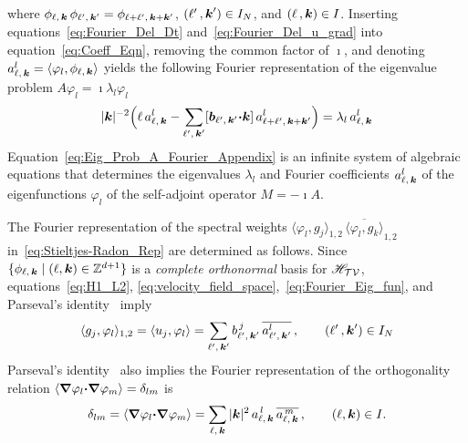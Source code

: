\documentclass[amsa]{ipart}
\begin{document}
%
where $\phi_{\ell,\,\boldsymbol{k}}\,\phi_{\ell^\prime,\,\boldsymbol{k}^\prime}=\phi_{\ell+\ell^\prime,\,\boldsymbol{k}+\boldsymbol{k}^\prime}$,
$(\ell^\prime\,,\boldsymbol{k}^\prime)\in I_N$, and $(\ell\,,\boldsymbol{k})\in I$. Inserting
equations~\eqref{eq:Fourier_Del_Dt} and~\eqref{eq:Fourier_Del_u_grad}
into equation~\eqref{eq:Coeff_Eqn}, removing the common factor of $\imath$,
and denoting $a^l_{\ell,\,\boldsymbol{k}}=\langle\varphi_l,\phi_{\ell,\,\boldsymbol{k}}\rangle$ yields the
following Fourier representation of the eigenvalue problem $A\varphi_l=\imath\lambda_l\varphi_l$
%
\begin{align}\label{eq:Eig_Prob_A_Fourier_Appendix}  
  |\veck|^{-2}\Big(
  \ell\,a^l_{\ell,\,\veck}
  - \sum_{\ell^\prime,\,\veck^\prime}   
  [\vecb_{\ell^\prime,\,\veck^\prime}\bcdot\veck]\, a^l_{\ell+\ell^\prime,\,\veck+\veck^\prime}
  \Big)
  =\lambda_l\,a^l_{\ell,\,\veck}  
\end{align}
%
Equation~\eqref{eq:Eig_Prob_A_Fourier_Appendix} is an infinite system
of algebraic equations that determines the eigenvalues $\lambda_l$ and
Fourier coefficients $a^l_{\ell,\,\boldsymbol{k}}$ of the eigenfunctions $\varphi_l$ of the
self-adjoint operator $M=-\imath A$. 



The Fourier representation of the spectral weights
$\langle\varphi_l,g_j\rangle_{1,2}\,\overline{\langle\varphi_l,g_k\rangle}_{1,2}$
in~\eqref{eq:Stieltjes-Radon_Rep} are determined as follows.
Since $\{\phi_{\ell,\,\boldsymbol{k}}\;|\; (\ell,\boldsymbol{k})\in\mathbb{Z}^{d+1}\}$ is a
\emph{complete orthonormal} basis for $\mathscr{H}_{\mathcal{T}\mathcal{V}}$, 
equations~\eqref{eq:H1_L2},
\eqref{eq:velocity_field_space},~\eqref{eq:Fourier_Eig_fun}, and
Parseval's identity~\cite{PapaRudin:87} imply  
%
\begin{align}\label{eq:Inner_Products}
  \langle g_j,\varphi_l\rangle_{1,2}=\langle u_j,\varphi_l\rangle=\sum_{\ell^\prime,\,\veck^\prime}
   b^{\,j}_{\ell^\prime,\,\veck^\prime}\,\overline{a^l_{\ell^\prime,\,\veck^\prime}}\,,
   \qquad
   (\ell^\prime\,,\veck^\prime)\in I_N
\end{align}
%
Parseval's identity~\cite{PapaRudin:87} also implies the Fourier
representation of the orthogonality relation 
$\langle\mbox{\boldmath${\nabla}$}\varphi_l\mbox{\boldmath${\cdot}$}\mbox{\boldmath${\nabla}$} \varphi_m\rangle=\delta_{lm}$ is 
%
\begin{align}\label{eq:Ortho_Clmn}
  \delta_{lm}=\langle\bnabla \varphi_l\bcdot\bnabla \varphi_m\rangle
      =
      \sum_{\ell,\,\veck}|\veck|^2\,a^{\,l}_{\ell,\,\veck}\,\overline{a^{\,m}_{\ell,\,\veck}}\,,
   \qquad
   (\ell,\veck)\in I.
\end{align}
%
\end{document}
